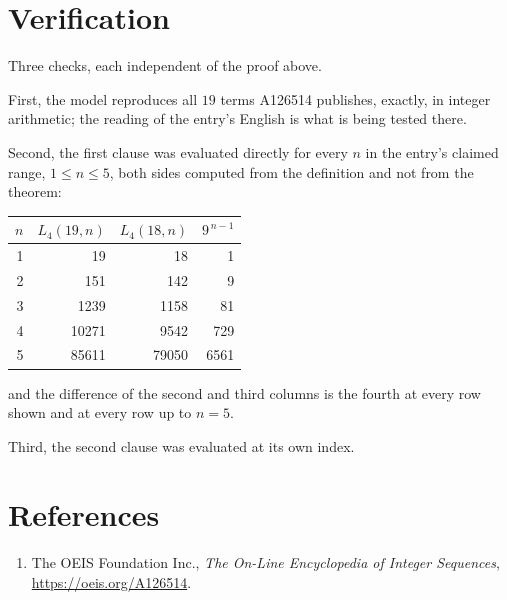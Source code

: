 \documentclass[11pt,a4paper]{article}
\theoremstyle{plain}
\theoremstyle{definition}
\begin{document}
\section{Verification}

Three checks, each independent of the proof above.

First, the model reproduces all $19$ terms A126514 publishes, exactly, in integer
arithmetic; the reading of the entry's English is what is being tested there.

Second, the first clause was evaluated directly for every $n$ in the entry's claimed range,
$1\le n\le5$, both sides computed from the definition and not from the theorem:

\begin{center}
\begin{tabular}{rrrr}
$n$ & $L_{4}(19,n)$ & $L_{4}(18,n)$ & $9^{\,n-1}$ \\ \hline
1 & 19 & 18 & 1 \\
2 & 151 & 142 & 9 \\
3 & 1239 & 1158 & 81 \\
4 & 10271 & 9542 & 729 \\
5 & 85611 & 79050 & 6561 \\
\end{tabular}
\end{center}

\noindent and the difference of the second and third columns is the fourth at every row shown
and at every row up to $n=5$.

Third, the second clause was evaluated at its own index.

\section*{References}
\begin{enumerate}
\item The OEIS Foundation Inc., \emph{The On-Line Encyclopedia of Integer Sequences},
\url{https://oeis.org/A126514}.
\end{enumerate}
\end{document}
